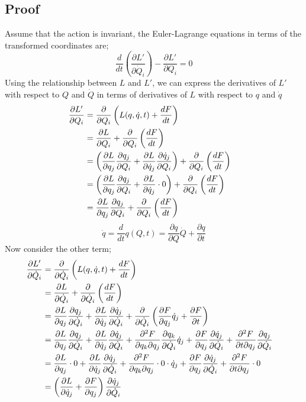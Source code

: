 \documentclass{article}
\begin{document}
\subsection{Proof}
Assume that the action is invariant, the Euler-Lagrange equations in terms of the transformed coordinates are;
\begin{equation}
	\frac{d}{dt} \left( \frac{\partial L'}{\partial \dot{Q}_i} \right) - \frac{\partial L'}{\partial Q_i} = 0
\end{equation}
Using the relationship between $L$ and $L'$, we can express the derivatives of $L'$ with respect to $Q$ and $\dot{Q}$ in terms of derivatives of $L$ with respect to $q$ and $\dot{q}$
\begin{align}
	\frac{\partial L'}{\partial Q_i} &= \frac{\partial}{\partial Q_i} \left( L(q, \dot{q}, t) + \frac{dF}{dt} \right) \cr
	&= \frac{\partial L}{\partial Q_i} + \frac{\partial}{\partial Q_i} \left( \frac{dF}{dt} \right) \cr
	&= \left( \frac{\partial L}{\partial q_j} \frac{\partial q_j}{\partial Q_i} + \frac{\partial L}{\partial \dot{q}_j} \frac{\partial \dot{q}_j}{\partial Q_i} \right) + \frac{\partial}{\partial Q_i} \left( \frac{dF}{dt} \right) \cr
	&= \left( \frac{\partial L}{\partial q_j} \frac{\partial q_j}{\partial Q_i} + \frac{\partial L}{\partial \dot{q}_j} \cdot 0 \right) + \frac{\partial}{\partial Q_i} \left( \frac{dF}{dt} \right) \cr
	&= \frac{\partial L}{\partial q_j} \frac{\partial q_j}{\partial Q_i} + \frac{\partial}{\partial Q_i}\left(\frac{dF}{dt}\right)
\end{align}
\[
    \dot q = \frac{d}{dt}q(Q,t) = \frac{\partial q}{\partial Q}\dot Q + \frac{\partial q}{\partial t}
\]
Now consider the other term;
\begin{align}
	\frac{\partial L'}{\partial \dot{Q}_i} &= \frac{\partial}{\partial \dot{Q}_i} \left( L(q, \dot{q}, t) + \frac{dF}{dt} \right) \cr
	&= \frac{\partial L}{\partial \dot{Q}_i} + \frac{\partial}{\partial \dot{Q}_i} \left( \frac{dF}{dt} \right) \cr
	&= \frac{\partial L}{\partial q_j} \frac{\partial q_j}{\partial \dot{Q}_i} + \frac{\partial L}{\partial \dot{q}_j} \frac{\partial \dot{q}_j}{\partial \dot{Q}_i} + \frac{\partial}{\partial \dot{Q}_i} \left( \frac{\partial F}{\partial q_j}\dot q_j + \frac{\partial F}{\partial t} \right) \cr
    &= \frac{\partial L}{\partial q_j} \frac{\partial q_j}{\partial \dot{Q}_i} + \frac{\partial L}{\partial \dot{q}_j} \frac{\partial \dot{q}_j}{\partial \dot{Q}_i} + \frac{\partial^2 F}{\partial q_k \partial q_j} \frac{\partial q_k}{\partial \dot Q_i}\dot q_j + \frac{\partial F}{\partial q_j} \frac{\partial \dot q_j}{\partial \dot Q_i} + \frac{\partial^2 F}{\partial t \partial q_j} \frac{\partial q_j}{\partial \dot Q_i} \cr
 	&= \frac{\partial L}{\partial q_j} \cdot 0 + \frac{\partial L}{\partial \dot{q}_j} \frac{\partial \dot{q}_j}{\partial \dot{Q}_i} + \frac{\partial^2 F}{\partial q_k \partial q_j} \cdot 0 \cdot \dot q_j + \frac{\partial F}{\partial q_j} \frac{\partial \dot q_j}{\partial \dot Q_i} + \frac{\partial^2 F}{\partial t \partial q_j} \cdot 0 \cr
	&= \left(\frac{\partial L}{\partial \dot{q}_j}  + \frac{\partial F}{\partial q_j}\right) \frac{\partial \dot{q}_j}{\partial \dot{Q}_i}
\end{align}
\end{document}
